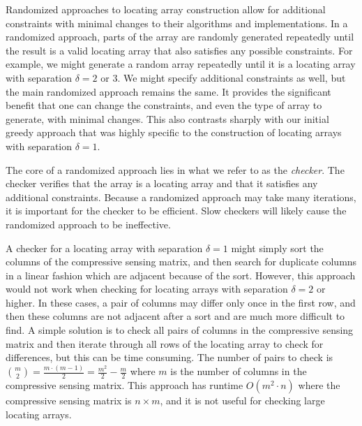 Randomized approaches to locating array construction allow for additional constraints with minimal changes to their algorithms and implementations.
In a randomized approach, parts of the array are randomly generated repeatedly until the result is a valid locating array that also satisfies any possible constraints.
For example, we might generate a random array repeatedly until it is a locating array with separation $\delta=2$ or $3$.
We might specify additional constraints as well, but the main randomized approach remains the same.
It provides the significant benefit that one can change the constraints, and even the type of array to generate, with minimal changes.
This also contrasts sharply with our initial greedy approach that was highly specific to the construction of locating arrays with separation $\delta=1$.

The core of a randomized approach lies in what we refer to as the \textit{checker}.
The checker verifies that the array is a locating array and that it satisfies any additional constraints.
Because a randomized approach may take many iterations, it is important for the checker to be efficient.
Slow checkers will likely cause the randomized approach to be ineffective.

A checker for a locating array with separation $\delta=1$ might simply sort the columns of the compressive sensing matrix, and then search for duplicate columns in a linear fashion which are adjacent because of the sort.
However, this approach would not work when checking for locating arrays with separation $\delta=2$ or higher.
In these cases, a pair of columns may differ only once in the first row, and then these columns are not adjacent after a sort and are much more difficult to find.
A simple solution is to check all pairs of columns in the compressive sensing matrix and then iterate through all rows of the locating array to check for differences, but this can be time consuming.
The number of pairs to check is ${m \choose 2} = \frac{m \cdot (m-1)}{2} = \frac{m^2}{2}-\frac{m}{2}$ where $m$ is the number of columns in the compressive sensing matrix.
This approach has runtime $O(m^2 \cdot n)$ where the compressive sensing matrix is $n \times m$, and it is not useful for checking large locating arrays.

